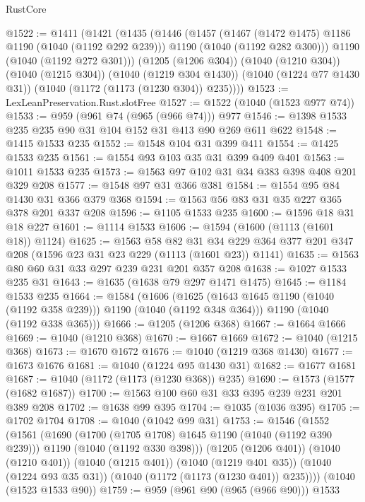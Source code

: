 \begin{lexlean}{RustCore}
\begin{coremodule}
@1522 := @1411
    (@1421
      (@1435
        (@1446
          (@1457
            (@1467 (@1472 @1475) @1186 @1190 (@1040 (@1192 @292 @239)))
            @1190
            (@1040 (@1192 @282 @300)))
          @1190
          (@1040 (@1192 @272 @301)))
        (@1205 (@1206 @304))
        (@1040 (@1210 @304))
        (@1040 (@1215 @304))
        (@1040 (@1219 @304 @1430))
        (@1040 (@1224 @77 @1430 @31))
        (@1040 (@1172 (@1173 (@1230 @304)) @235))))
@1523 := LexLeanPreservation.Rust.slotFree
@1527 := @1522 (@1040 (@1523 @977 @74))
@1533 := @959 (@961 @74 (@965 (@966 @74))) @977
@1546 := @1398 @1533 @235 @235 @90 @31 @104 @152 @31 @413 @90 @269 @611 @622
@1548 := @1415 @1533 @235
@1552 := @1548 @104 @31 @399 @411
@1554 := @1425 @1533 @235
@1561 := @1554 @93 @103 @35 @31 @399 @409 @401
@1563 := @1011 @1533 @235
@1573 := @1563 @97 @102 @31 @34 @383 @398 @408 @201 @329 @208
@1577 := @1548 @97 @31 @366 @381
@1584 := @1554 @95 @84 @1430 @31 @366 @379 @368
@1594 := @1563 @56 @83 @31 @35 @227 @365 @378 @201 @337 @208
@1596 := @1105 @1533 @235
@1600 := @1596 @18 @31 @18 @227
@1601 := @1114 @1533
@1606 := @1594 (@1600 (@1113 (@1601 @18)) @1124)
@1625 := @1563
    @58
    @82
    @31
    @34
    @229
    @364
    @377
    @201
    @347
    @208
    (@1596 @23 @31 @23 @229 (@1113 (@1601 @23)) @1141)
@1635 := @1563 @80 @60 @31 @33 @297 @239 @231 @201 @357 @208
@1638 := @1027 @1533 @235 @31
@1643 := @1635 (@1638 @79 @297 @1471 @1475)
@1645 := @1184 @1533 @235
@1664 := @1584
    (@1606
      (@1625 (@1643 @1645 @1190 (@1040 (@1192 @358 @239))) @1190 (@1040 (@1192 @348 @364)))
      @1190
      (@1040 (@1192 @338 @365)))
@1666 := @1205 (@1206 @368)
@1667 := @1664 @1666
@1669 := @1040 (@1210 @368)
@1670 := @1667 @1669
@1672 := @1040 (@1215 @368)
@1673 := @1670 @1672
@1676 := @1040 (@1219 @368 @1430)
@1677 := @1673 @1676
@1681 := @1040 (@1224 @95 @1430 @31)
@1682 := @1677 @1681
@1687 := @1040 (@1172 (@1173 (@1230 @368)) @235)
@1690 := @1573 (@1577 (@1682 @1687))
@1700 := @1563 @100 @60 @31 @33 @395 @239 @231 @201 @389 @208
@1702 := @1638 @99 @395
@1704 := @1035 (@1036 @395)
@1705 := @1702 @1704
@1708 := @1040 (@1042 @99 @31)
@1753 := @1546
    (@1552
      (@1561
        (@1690
          (@1700 (@1705 @1708) @1645 @1190 (@1040 (@1192 @390 @239)))
          @1190
          (@1040 (@1192 @330 @398)))
        (@1205 (@1206 @401))
        (@1040 (@1210 @401))
        (@1040 (@1215 @401))
        (@1040 (@1219 @401 @35))
        (@1040 (@1224 @93 @35 @31))
        (@1040 (@1172 (@1173 (@1230 @401)) @235))))
    (@1040 (@1523 @1533 @90))
@1759 := @959 (@961 @90 (@965 (@966 @90))) @1533

\end{coremodule}
\end{lexlean}
